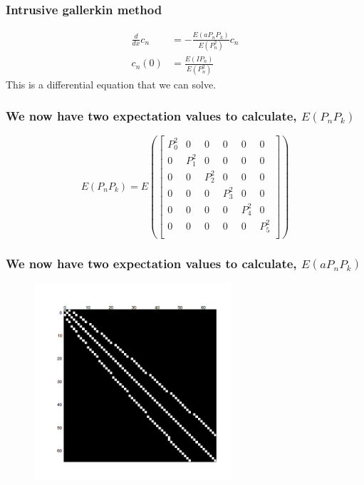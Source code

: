 \documentclass{beamer}
\begin{document}
\begin{frame}
 \frametitle{Intrusive gallerkin method}
 \begin{align*}
 \frac{d}{dx}c_n &= -\frac{E(aP_nP_k)}{E(P_n^2)}c_n\\
 c_n(0) &= \frac{E(IP_n)}{E(P_n^2)}
 \end{align*}
 This is a differential equation that we can solve.

 \end{frame}

 
\begin{frame}
 \frametitle{We now have two expectation values to calculate, $E(P_nP_k)$}
\[E(P_nP_k) = E \left(\left[\begin{matrix}
               P_0^2 &0&0&0&0&0 \\
               0& P_1^2 &0&0&0&0\\
               0&0& P_2^2 &0&0&0\\
               0&0&0& P_3^2 &0&0\\
	       0&0&0&0& P_4^2 &0\\
               0&0&0&0&0& P_5^2\\
               \end{matrix}\right]\right)
\]
 
 \end{frame}


\begin{frame}
 \frametitle{We now have two expectation values to calculate, $E(aP_nP_k)$}
  \begin{figure}
  \includegraphics[width=0.65\textwidth]{binary_matrix.png}
 \end{figure}
 \end{frame}

 
\end{document}
